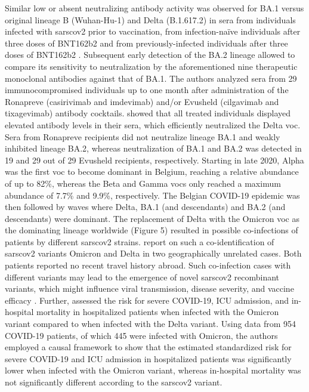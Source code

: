 Similar low or absent neutralizing antibody activity was observed for BA.1 versus original lineage B (Wuhan-Hu-1) and Delta (B.1.617.2) in sera from individuals infected with \gls{sarscov2} prior to vaccination, from infection-na\"{i}ve individuals after three doses of BNT162b2 and from previously-infected individuals after three doses of BNT162b2 \citep{arin2022three}.
Subsequent early detection of the BA.2 lineage allowed \citet{bruel2022serum} to compare its sensitivity to neutralization by the aforementioned nine therapeutic monoclonal antibodies against that of BA.1.
The authors analyzed sera from 29 immunocompromised individuals up to one month after administration of the Ronapreve (casirivimab and imdevimab) and/or Evusheld (cilgavimab and tixagevimab) antibody cocktails.
\citet{bruel2022serum} showed that all treated individuals displayed elevated antibody levels in their sera, which efficiently neutralized the Delta \gls{voc}.
Sera from Ronapreve recipients did not neutralize lineage BA.1 and weakly inhibited lineage BA.2, whereas neutralization of BA.1 and BA.2 was detected in 19 and 29 out of 29 Evusheld recipients, respectively.
Starting in late 2020, Alpha was the first \gls{voc} to become dominant in Belgium, reaching a relative abundance of up to 82\%, whereas the Beta and Gamma \gls{voc}s only reached a maximum abundance of 7.7\% and 9.9\%, respectively.
The Belgian COVID-19 epidemic was then followed by waves where Delta, BA.1 (and descendants) and BA.2 (and descendants) were dominant.
The replacement of Delta with the Omicron \gls{voc} as the dominating lineage worldwide (Figure 5) resulted in possible co-infections of patients by different \gls{sarscov2} strains.
\citet{wawina-bokalanga2022genomic} report on such a co-identification of \gls{sarscov2} variants Omicron and Delta in two geographically unrelated cases.
Both patients reported no recent travel history abroad.
Such co-infection cases with different variants may lead to the emergence of novel \gls{sarscov2} recombinant variants, which might influence viral transmission, disease severity, and vaccine efficacy \citep{rehman2020evolutionary}.
Further, \citet{vangoethem2022clinical} assessed the risk for severe COVID-19, ICU admission, and in-hospital mortality in hospitalized patients when infected with the Omicron variant compared to when infected with the Delta variant.
Using data from 954 COVID-19 patients, of which 445 were infected with Omicron, the authors employed a causal framework to show that the estimated standardized risk for severe COVID-19 and ICU admission in hospitalized patients was significantly lower when infected with the Omicron variant, whereas in-hospital mortality was not significantly different according to the \gls{sarscov2} variant.


